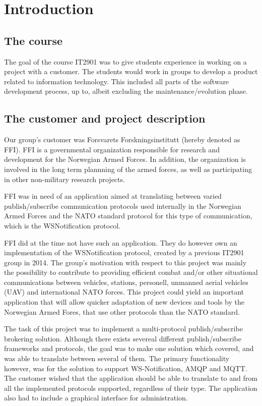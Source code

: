 
\chapter{Introduction}

\section{The course}

The goal of the course IT2901 was to give students experience in working on a project with a customer. The students would work in groups to develop a product related to information technology. This included all parts of the software development process, up to, albeit excluding the maintenance/evolution phase.

\section{The customer and project description}

Our group's customer was Forsvarets Forskningsinstitutt (hereby denoted as FFI). FFI is a governmental organization responsible for research and development for the Norwegian Armed Forces. In addition, the organization is involved in the long term plannning of the armed forces, as well as participating in other non-military research projects.

FFI was in need of an application aimed at translating between varied publish/subscribe communication protocols used internally in the Norwegian Armed Forces and the NATO standard protocol for this type of communication, which is the WSNotification protocol.

FFI did at the time not have such an application. They do however own an implementation of the WSNotification protocol, created by a previous IT2901 group in 2014. The group's motivation with respect to this project was mainly the possibility to contribute to providing efficient combat and/or other situational communications between vehicles, stations, personell, unmanned aerial vehicles (UAV) and international NATO forces. This project could yield an important application that will allow quicker adaptation of new devices and tools by the Norwegian Armed Fores, that use other protocols than the NATO standard.

The task of this project was to implement a multi-protocol publish/subscribe brokering solution. Although there exists severeal different publish/subscribe frameworks and protocols, the goal was to make one solution which covered, and was able to translate between several of them. The primary functionality however, was for the solution to support WS-Notification, AMQP and MQTT. The customer wished that the application should be able to translate to and from all the implemented protocols supported, regardless of their type. The application also had to include a graphical interface for administration.

